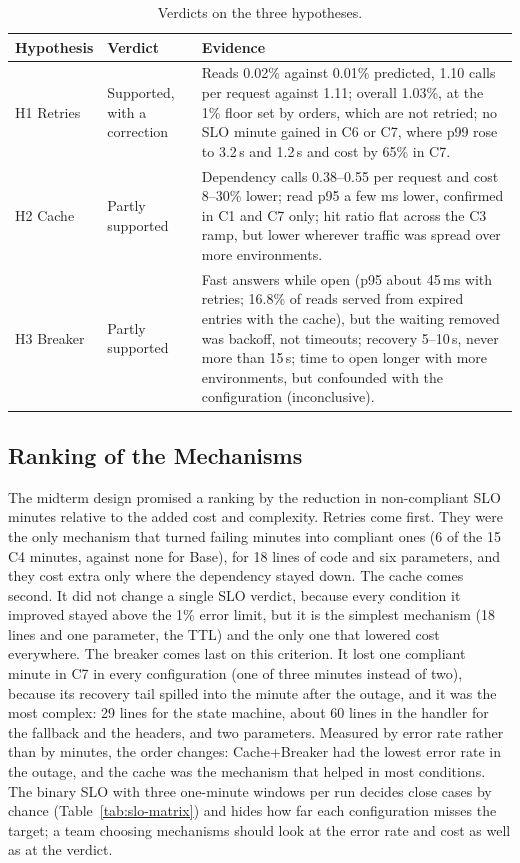 \documentclass[10pt]{article}
\begin{document}
\begin{table}[htbp]
\centering
\footnotesize
\begin{tabularx}{\linewidth}{@{}l>{\raggedright\arraybackslash}p{2.4cm}X@{}}
\toprule
\textbf{Hypothesis} & \textbf{Verdict} & \textbf{Evidence} \\
\midrule
H1 Retries & Supported, with a correction &
  Reads 0.02\% against 0.01\% predicted, 1.10 calls per request against 1.11;
  overall 1.03\%, at the 1\% floor set by orders, which are not retried; no SLO
  minute gained in C6 or C7, where p99 rose to 3.2\,s and 1.2\,s and cost by
  65\% in C7. \\
H2 Cache & Partly supported &
  Dependency calls 0.38--0.55 per request and cost 8--30\% lower; read p95 a few
  ms lower, confirmed in C1 and C7 only; hit ratio flat across the C3 ramp, but
  lower wherever traffic was spread over more environments. \\
H3 Breaker & Partly supported &
  Fast answers while open (p95 about 45\,ms with retries; 16.8\% of reads served
  from expired entries with the cache), but the waiting removed was backoff, not
  timeouts; recovery 5--10\,s, never more than 15\,s; time to open longer with
  more environments, but confounded with the configuration (inconclusive). \\
\bottomrule
\end{tabularx}
\caption{Verdicts on the three hypotheses.}
\label{tab:hypotheses}
\end{table}

\subsection{Ranking of the Mechanisms}
The midterm design promised a ranking by the reduction in non-compliant SLO
minutes relative to the added cost and complexity. Retries come first. They
were the only mechanism that turned failing minutes into compliant ones (6 of
the 15 C4 minutes, against none for Base), for 18 lines of code and six
parameters, and they cost extra only where the dependency stayed down. The
cache comes second. It did not change a single SLO verdict, because every
condition it improved stayed above the 1\% error limit, but it is the simplest
mechanism (18 lines and one parameter, the TTL) and the only one that lowered
cost everywhere. The breaker comes last on this criterion. It lost one
compliant minute in C7 in every configuration (one of three minutes instead of
two), because its recovery tail spilled into the minute after the outage, and
it was the most complex: 29 lines for the state machine, about 60 lines in the
handler for the fallback and the headers, and two parameters. Measured by error
rate rather than by minutes, the order changes: Cache+Breaker had the lowest
error rate in the outage, and the cache was the mechanism that helped in most
conditions. The binary SLO with three one-minute windows per run decides close
cases by chance (Table~\ref{tab:slo-matrix}) and hides how far each
configuration misses the target; a team choosing mechanisms should look at the
error rate and cost as well as at the verdict.
\end{document}

